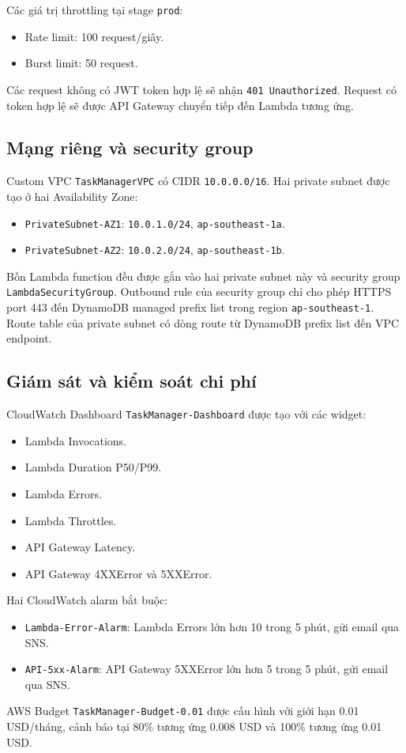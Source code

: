 Các giá trị throttling tại stage \texttt{prod}:

\begin{itemize}
    \item Rate limit: 100 request/giây.
    \item Burst limit: 50 request.
\end{itemize}

Các request không có JWT token hợp lệ sẽ nhận \texttt{401 Unauthorized}. Request có token hợp lệ sẽ được API Gateway chuyển tiếp đến Lambda tương ứng.

\subsection{Mạng riêng và security group}

Custom VPC \texttt{TaskManagerVPC} có CIDR \texttt{10.0.0.0/16}. Hai private subnet được tạo ở hai Availability Zone:

\begin{itemize}
    \item \texttt{PrivateSubnet-AZ1}: \texttt{10.0.1.0/24}, \texttt{ap-southeast-1a}.
    \item \texttt{PrivateSubnet-AZ2}: \texttt{10.0.2.0/24}, \texttt{ap-southeast-1b}.
\end{itemize}

Bốn Lambda function đều được gắn vào hai private subnet này và security group \texttt{LambdaSecurityGroup}. Outbound rule của security group chỉ cho phép HTTPS port 443 đến DynamoDB managed prefix list trong region \texttt{ap-southeast-1}. Route table của private subnet có dòng route từ DynamoDB prefix list đến VPC endpoint.

\subsection{Giám sát và kiểm soát chi phí}

CloudWatch Dashboard \texttt{TaskManager-Dashboard} được tạo với các widget:

\begin{itemize}
    \item Lambda Invocations.
    \item Lambda Duration P50/P99.
    \item Lambda Errors.
    \item Lambda Throttles.
    \item API Gateway Latency.
    \item API Gateway 4XXError và 5XXError.
\end{itemize}

Hai CloudWatch alarm bắt buộc:

\begin{itemize}
    \item \texttt{Lambda-Error-Alarm}: Lambda Errors lớn hơn 10 trong 5 phút, gửi email qua SNS.
    \item \texttt{API-5xx-Alarm}: API Gateway 5XXError lớn hơn 5 trong 5 phút, gửi email qua SNS.
\end{itemize}

AWS Budget \texttt{TaskManager-Budget-0.01} được cấu hình với giới hạn 0.01 USD/tháng, cảnh báo tại 80\% tương ứng 0.008 USD và 100\% tương ứng 0.01 USD.
